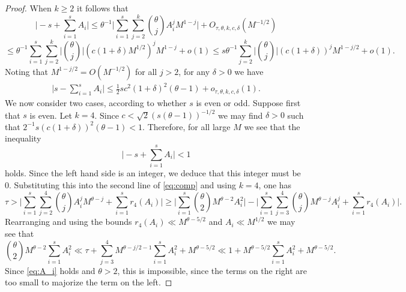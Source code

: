 \documentclass[11pt,reqno]{amsart}
\numberwithin{equation}{section}
\begin{document}
\begin{proof}
When $k \geq 2$ it follows that 
\[ \Big|-s+\sum_{i=1}^s A_i\Big| \leq \theta^{-1}\Big|\sum_{i=1}^s \sum_{j=2}^k \binom{\theta}{j}A_i^jM^{1-j}\Big|+O_{\tau, \theta, k, c, \delta}(M^{-1/2}) \]
\[ \leq \theta^{-1}\sum_{i=1}^s \sum_{j=2}^k \Big|\binom{\theta}{j}\Big|(c(1+\delta)M^{1/2})^jM^{1-j}+o(1) \leq s\theta^{-1} \sum_{j=2}^k \Big| \binom{\theta}{j} \Big| (c(1+\delta))^j M^{1-j/2}+o(1). \]
Noting that $M^{1-j/2} = O(M^{-1/2})$ for all $j > 2$, for any $\delta > 0$ we have 
\begin{align} \label{eq:sA_i}
\Big|s-\sum_{i=1}^s A_i\Big| \leq \frac{1}{2}sc^2(1+\delta)^2(\theta-1)+o_{\tau, \theta, k, c, \delta}(1). 
\end{align}
We now consider two cases, according to whether $s$ is even or odd. Suppose first that $s$ is even. Let $k = 4$. 
Since $c < \sqrt{2}(s(\theta-1))^{-1/2}$ we may find $\delta > 0$ such that $2^{-1}s(c(1+\delta))^2(\theta-1) < 1$. Therefore, for all large $M$ we see that the inequality 
\[ \Big|-s+\sum_{i=1}^s A_i\Big| < 1 \]
holds. Since the left hand side is an integer, we deduce that this integer must be $0$. Substituting this into the second line of \eqref{eq:comp} and using $k = 4$, one has 
\[ \tau > \Big|\sum_{i=1}^s \sum_{j=2}^4 \binom{\theta}{j} A_i^jM^{\theta-j} +\sum_{i=1}^s r_4(A_i)\Big| \geq \Big|\sum_{i=1}^s \binom{\theta}{2}M^{\theta-2}A_i^2\Big| - \Big|\sum_{i=1}^s \sum_{j=3}^4 \binom{\theta}{j}M^{\theta-j}A_i^j+\sum_{i=1}^s r_4(A_i)\Big|. \]
Rearranging and using the bounds $r_4(A_i) \ll M^{\theta-5/2}$ and $A_i \ll M^{1/2}$ we may see that 
\[ \binom{\theta}{2}M^{\theta-2}\sum_{i=1}^s A_i^2 \ll \tau + \sum_{j=3}^4 M^{\theta-j/2-1}\sum_{i=1}^s A_i^2+M^{\theta-5/2} \ll 1 +M^{\theta-5/2}\sum_{i=1}^s A_i^2+M^{\theta-5/2} . \]
Since \eqref{eq:A_i} holds and $\theta > 2$, this is impossible, since the terms on the right are too small to majorize the term on the left.  


\end{proof}
\end{document}
